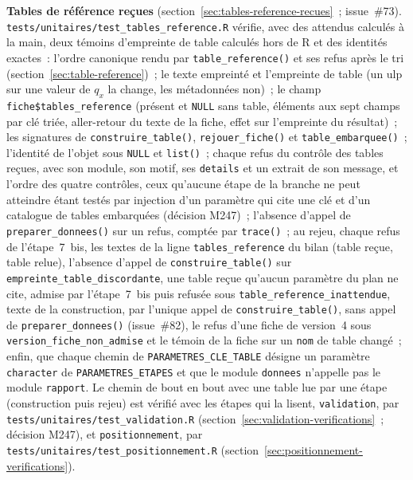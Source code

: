 \documentclass[a4paper,11pt]{article}
\newcommand{\code}[1]{\texttt{\small #1}}
\begin{document}
\medskip
{\sloppy \textbf{Tables de référence reçues} (section~\ref{sec:tables-reference-recues}~;
issue~\#73). \code{tests/unitaires/test\_tables\_reference.R} vérifie, avec
des attendus calculés à la main, deux témoins d'empreinte de table calculés
hors de R et des identités exactes~: l'ordre canonique rendu par
\code{table\_reference()} et ses refus après le tri
(section~\ref{sec:table-reference})~; le texte empreinté et l'empreinte de
table (un ulp sur une valeur de $q_x$ la change, les métadonnées non)~; le
champ \code{fiche\$tables\_reference} (présent et \code{NULL} sans table,
éléments aux sept champs par clé triée, aller-retour du texte de la fiche,
effet sur l'empreinte du résultat)~; les signatures de
\code{construire\_table()}, \code{rejouer\_fiche()} et
\code{table\_embarquee()}~; l'identité de l'objet sous \code{NULL} et
\code{list()}~; chaque refus du contrôle des tables reçues, avec son module,
son motif, ses \code{details} et un extrait de son message, et l'ordre des
quatre contrôles, ceux qu'aucune étape de la branche ne peut atteindre étant
testés par injection d'un paramètre qui cite une clé et d'un catalogue de
tables embarquées (décision M247)~; l'absence d'appel de
\code{preparer\_donnees()} sur un refus, comptée par \code{trace()}~; au
rejeu, chaque refus de l'étape~7~bis, les textes de la ligne
\code{tables\_reference} du bilan (table reçue, table relue), l'absence
d'appel de \code{construire\_table()} sur \code{empreinte\_table\_discordante},
une table reçue qu'aucun paramètre du plan ne cite, admise par l'étape~7~bis
puis refusée sous \code{table\_reference\_inattendue}, texte de la
construction, par l'unique appel de \code{construire\_table()}, sans appel
de \code{preparer\_donnees()} (issue~\#82), le refus d'une fiche de version~4 sous \code{version\_fiche\_non\_admise}
et le témoin de la fiche sur un \code{nom} de table changé~; enfin, que
chaque chemin de \code{PARAMETRES\_CLE\_TABLE} désigne un paramètre
\code{character} de \code{PARAMETRES\_ETAPES} et que le module
\code{donnees} n'appelle pas le module \code{rapport}. Le chemin de bout en
bout avec une table lue par une étape (construction puis rejeu) est vérifié
avec les étapes qui la lisent, \code{validation}, par
\code{tests/unitaires/test\_validation.R}
(section~\ref{sec:validation-verifications}~; décision M247), et
\code{positionnement}, par \code{tests/unitaires/test\_positionnement.R}
(section~\ref{sec:positionnement-verifications}).\par}
\end{document}
